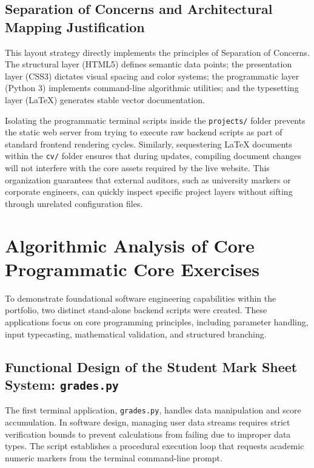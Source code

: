 \documentclass[12pt,a4paper]{article}
\begin{document}
\subsection{Separation of Concerns and Architectural Mapping Justification}
This layout strategy directly implements the principles of Separation of Concerns. The structural layer (HTML5) defines semantic data points; the presentation layer (CSS3) dictates visual spacing and color systems; the programmatic layer (Python 3) implements command-line algorithmic utilities; and the typesetting layer (LaTeX) generates stable vector documentation. 

Isolating the programmatic terminal scripts inside the \texttt{projects/} folder prevents the static web server from trying to execute raw backend scripts as part of standard frontend rendering cycles. Similarly, sequestering LaTeX documents within the \texttt{cv/} folder ensures that during updates, compiling document changes will not interfere with the core assets required by the live website. This organization guarantees that external auditors, such as university markers or corporate engineers, can quickly inspect specific project layers without sifting through unrelated configuration files.

\section{Algorithmic Analysis of Core Programmatic Core Exercises}
To demonstrate foundational software engineering capabilities within the portfolio, two distinct stand-alone backend scripts were created. These applications focus on core programming principles, including parameter handling, input typecasting, mathematical validation, and structured branching.

\subsection{Functional Design of the Student Mark Sheet System: \texttt{grades.py}}
The first terminal application, \texttt{grades.py}, handles data manipulation and score accumulation. In software design, managing user data streams requires strict verification bounds to prevent calculations from failing due to improper data types. The script establishes a procedural execution loop that requests academic numeric markers from the terminal command-line prompt.
\end{document}
